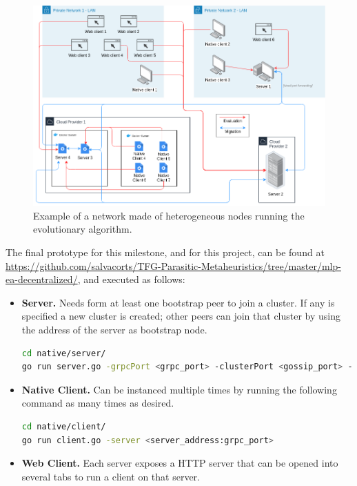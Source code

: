 \begin{figure}[h!]
		\centering
    	\includegraphics[width=\linewidth]{assets/images/tfg-net.png}
    	\caption{Example of a network made of heterogeneous nodes running the evolutionary algorithm.}
    	\label{fig:tfg-net}
\end{figure}

The final prototype for this milestone, and for this project, can be found at \href{github.com/salvacorts/TFG-Parasitic-Metaheuristics/tree/master/mlp-ea-centralized/common}{https://github.com/salvacorts/TFG-Parasitic-Metaheuristics/tree/master/mlp-ea-decentralized/}, and executed as follows:

\begin{itemize}
	\item \textbf{Server.} Needs form at least one bootstrap peer to join a cluster. If any is specified a new cluster is created; other peers can join that cluster by using the address of the server as bootstrap node.
\begin{lstlisting}[language=bash]
cd native/server/
go run server.go -grpcPort <grpc_port> -clusterPort <gossip_port> -clusterBoostrap <peer1_addr:peer1_gossip_port,peer2_addr:peer2_gossip_port>
\end{lstlisting}

	\item \textbf{Native Client.} Can be instanced multiple times by running the following command as many times as desired.
\begin{lstlisting}[language=bash]
cd native/client/
go run client.go -server <server_address:grpc_port>
\end{lstlisting}

	\item \textbf{Web Client.} Each server exposes a HTTP server that can be opened into several tabs to run a client on that server.
\end{itemize}

